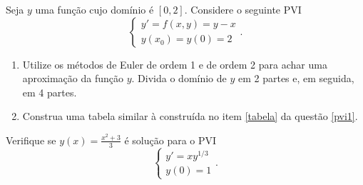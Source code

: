 \begin{ex}
Seja $y$ uma função cujo domínio é $[0,2]$. Considere o seguinte PVI
$$\begin{cases}
y'=f(x,y)=y-x\\
y(x_0)=y(0)=2
\end{cases}.$$

\begin{enumerate}
\item Utilize os métodos de Euler de ordem 1 e de ordem 2 para achar uma aproximação da função $y$. Divida o domínio de $y$ em 2 partes e, em seguida, em 4 partes.
\item Construa uma tabela similar à construída no item \ref{tabela} da questão \ref{pvi1}.
\end{enumerate}
\end{ex}



\begin{ex}
Verifique se $y(x)=\frac{x^2+3}{3}$ é solução para o PVI
$$
\begin{cases}
y'=xy^{1/3}\\
y(0)=1
\end{cases}.
$$
\end{ex}


